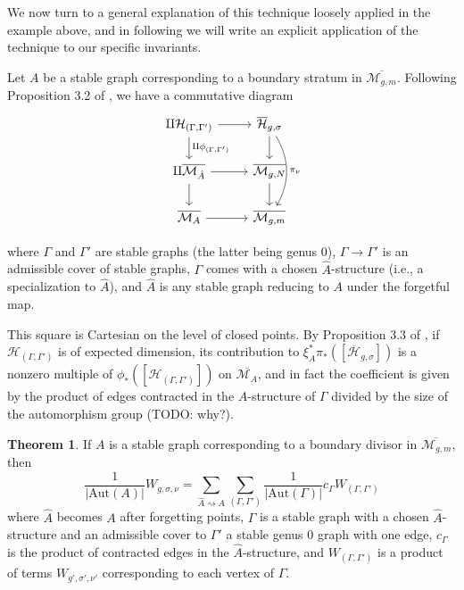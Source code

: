 \documentclass[11pt]{article}           %
\newcommand{\Aut}{\text{Aut}}
\newcommand{\Hb}{\overline{\mathcal H}}
\theoremstyle{definition}
\newtheorem{thm}{Theorem}[section]
\begin{document}
                We now turn to a general explanation of this technique loosely applied in the example above, and in following \cite{Generalized} we will write an explicit application of the technique to our specific invariants.
                


Let $A$ be a stable graph
corresponding to a boundary stratum in $\overline{\mathcal M_{g,m}}$.
Following Proposition 3.2 of \cite{Lian}, we have a commutative diagram
\[\begin{tikzcd}
\amalg \mathcal H_{(\Gamma,\Gamma')} & \Hb_{g,\sigma} \\
\amalg \overline{\mathcal M_{\hat A}} & \overline{\mathcal M_{g,N}} \\
	\overline{\mathcal M_A} & \overline{\mathcal M_{g,m}}
	\arrow[from=1-1, to=1-2]
	\arrow[from=1-1, to=2-1, "\amalg \phi_{(\Gamma,\Gamma')}"]
        \arrow[from=2-1, to=3-1]
	\arrow[from=1-2, to=2-2]
	\arrow[from=2-1, to=2-2]
        \arrow[from=2-2, to=3-2]
        \arrow[from=3-1, to=3-2]
        \arrow[from=1-2, to=3-2, bend left, "\pi_{\nu}"]
\end{tikzcd}\]

where $\Gamma$ and $\Gamma'$ are stable graphs (the latter being genus $0$), $\Gamma\to\Gamma'$ is an admissible cover of stable graphs, $\Gamma$
comes with a chosen $\hat A$-structure (i.e., a specialization to $\hat A$),
and $\hat A$ is any stable graph reducing to $A$ under the forgetful map.

This square is Cartesian on the level of closed points. By
Proposition 3.3 of \cite{Lian}, if $\mathcal H_{(\Gamma,\Gamma')}$ is of
expected dimension, its contribution to $\xi_A^*\pi_*([\Hb_{g,\sigma}])$
is a nonzero multiple of $\phi_*([\mathcal H_{(\Gamma,\Gamma')}])$ on $\overline{\mathcal M_A}$, and in fact the coefficient is given by the product of edges contracted in the $A$-structure of $\Gamma$ divided by the size of the automorphism group (TODO: why?).

\begin{thm}
  \label{thm:admissible}
  If $A$ is a stable graph corresponding to a boundary divisor in $\overline{\mathcal M_{g,m}}$, then
  \[
  \frac 1{|\Aut(A)|}W_{g,\sigma,\nu}=\sum_{\hat A\rightsquigarrow A}\sum_{(\Gamma,\Gamma')}\frac 1{|\Aut(\Gamma)|}c_{\Gamma}W_{(\Gamma,\Gamma')}
  \]
  where $\hat A$ becomes $A$ after forgetting points, $\Gamma$ is a stable graph with a chosen $\hat A$-structure and an admissible
  cover to $\Gamma'$ a stable genus $0$ graph with one edge, $c_{\Gamma}$ is the
  product of contracted edges in the $\hat A$-structure, and
  $W_{(\Gamma,\Gamma')}$ is a product of terms $W_{g',\sigma',\nu'}$ corresponding to each vertex of $\Gamma$.
\end{thm}
\end{document}
